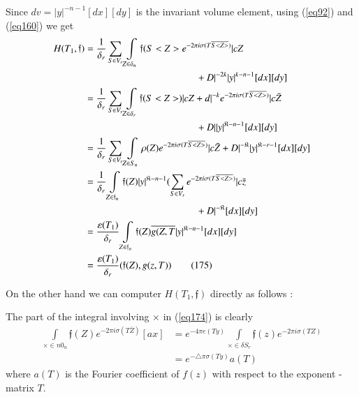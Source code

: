 Since $d v = | y |^{- n - 1} [ d x] [d y ]$ is the invariant volume
element, using (\ref{eq92}) and (\ref{eq160}) we get  
\begin{align*}
 H(T_1, \mathfrak{f}) & = \frac{1}{\delta_r} \sum_{S \in V_r} \int\limits_{Z
    \in \delta_n} \mathfrak{f} (S < Z > e^{- 2 \pi i \sigma (T
    \overline{S<Z>})} |c Z \\
& \hspace{2.6cm} \qquad \qquad + D |^{-2 k} | y |^{k - n - 1} [d x ][d
    y]\\ 
& = \frac{1}{\delta_r} \sum_{S \in V_r} \int\limits_{Z \in \delta_r}
  \mathfrak{f} (S <Z>) | c Z + d |^{-k} e^{-2 \pi i \sigma (T
    \overline{S <Z>})} | c \bar{Z}\\
& \hspace{2.6cm} \qquad \qquad  + D | |y |^{\mathfrak{K} - n - 1} [d
    x] [dy]\\ 
& = \frac{1}{\delta_r} \sum_{S \in V_r} \int\limits_{Z \in S_n} \rho (Z) e^{-
    2 \pi i \sigma (T \overline{S<Z>})} | c \bar{Z} + D
  |^{-\mathfrak{K}} | y |^{\mathfrak{K} - r - 1} [dx ]  [d y]\\ 
& = \frac{1}{\delta_r} \int\limits_{Z \in \mathfrak{f}_n} \mathfrak{f} (Z) | y
  |^{\mathfrak{K}-n - 1}  (\sum_{S \in V_r} e^{-2 \pi i \sigma (T
    \overline{S<Z>})} | c \bar{z} \\
& \hspace{2.6cm} \qquad \qquad + D |^{-\mathfrak{K}} [d x ] [ dy]\\ 
& = \frac{\varepsilon (T_1)}{\delta_r} \int\limits_{Z \in
    \mathfrak{f}_n} \mathfrak{f}(Z) \overline{ g (Z, T} |y|^{\mathfrak{K}
    - n - 1} [d x ] [d y]\\ 
& = \frac{\varepsilon(T_1)}{\delta_r} (\mathfrak{f} (Z), g (z, T))
  \tag{175}\label{eq175}  
\end{align*}\pageoriginale 

On the other hand we can computer $H (T_1, \mathfrak{f})$ directly as  
follows : 

The part of the integral involving $\times$ in (\ref{eq174}) is clearly  
\begin{align*}
\int\limits_{\times \in n 0_n} \mathfrak{f}(Z) e^{- 2 \pi i \sigma (T
  \bar{Z})} [ a x] & = e^{-4 \pi e (T y)} \int\limits_{\times \in \delta S_r
} \mathfrak{f} (z) e^{-2 \pi i \sigma (T Z) }\\ 
& = e^{-\triangle \pi \sigma (T y)} a (T)
\end{align*}
where $a (T)$ is the Fourier coefficient of $f(z)$ with respect to the
exponent - matrix $T$. 

